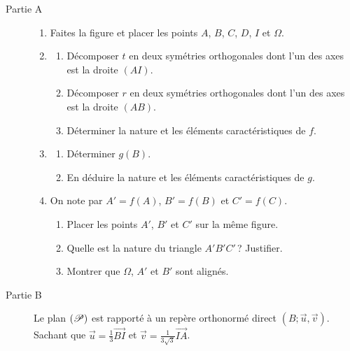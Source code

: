       \begin{description}
            \item[Partie A]
                  \begin{enumerate}
                        \item Faites la figure et placer les points $A$, $B$, $C$, $D$, $I$ et $\Omega$.
                        \item \begin{enumerate}
                                    \item D\'ecomposer $t$ en deux sym\'etries orthogonales 
                                          dont l'un des axes est la droite $(AI)$.
                                    \item D\'ecomposer $r$ en deux sym\'etries orthogonales 
                                          dont l'un des axes est la droite $(AB)$.
                                    \item D\'eterminer la nature et les \'el\'ements caract\'eristiques de $f$.
                              \end{enumerate}
                        \item \begin{enumerate}
                                    \item D\'eterminer $g(B)$.
                                    \item En d\'eduire la nature et les \'el\'ements caract\'eristiques de $g$.
                              \end{enumerate}
                        \item On note par $A' = f(A)$, $B' = f(B)$ et $C' = f(C)$.
                              \begin{enumerate}
                                    \item Placer les points $A'$, $B'$ et $C'$ sur la m\^eme figure.
                                    \item Quelle est la nature du triangle $A'B'C'$\,? Justifier.
                                    \item Montrer que $\Omega$, $A'$ et $B'$ sont align\'es.
                              \end{enumerate}
                  \end{enumerate}
            \item[Partie B]
                  Le plan $(\mathscr{P})$ est rapport\'e \`a un rep\`ere orthonorm\'e direct $(B;\vec{u},\vec{v})$.
                  Sachant que $\vec{u} = \frac{1}{3} \overrightarrow{BI}$ et $\vec{v} = \frac{1}{3\sqrt{3}} \overrightarrow{IA}$.

\end{description}
